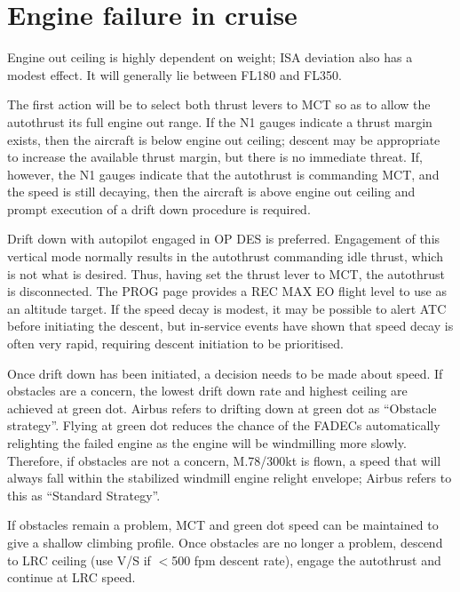 \documentclass[a5paper,11pt,twoside]{book}
\newcommand{\multicite}[1]{
  \nopagebreak
  \noindent{\footnotesize\color{blue}{[ #1 ]}}
}
\begin{document}
\multicite{QRH AER.MISC, FCOM PRO.AER.MISC, FCTM PRO.AER.MISC}

\section{Engine failure in cruise}

Engine out ceiling is highly dependent on weight; ISA deviation also has a
modest effect. It will generally lie between FL180 and FL350.

The first action will be to select both thrust levers to MCT so as to allow the
autothrust its full engine out range. If the N1 gauges indicate a thrust margin
exists, then the aircraft is below engine out ceiling; descent may be
appropriate to increase the available thrust margin, but there is no immediate
threat. If, however, the N1 gauges indicate that the autothrust is commanding
MCT, and the speed is still decaying, then the aircraft is above engine out
ceiling and prompt execution of a drift down procedure is required.

Drift down with autopilot engaged in OP DES is preferred. Engagement of this
vertical mode normally results in the autothrust commanding idle thrust, which
is not what is desired. Thus, having set the thrust lever to MCT, the autothrust
is disconnected. The PROG page provides a REC MAX EO flight level to use as an
altitude target. If the speed decay is modest, it may be possible to alert ATC
before initiating the descent, but in-service events have shown that speed decay
is often very rapid, requiring descent initiation to be prioritised.

Once drift down has been initiated, a decision needs to be made about speed. If
obstacles are a concern, the lowest drift down rate and highest ceiling are
achieved at green dot. Airbus refers to drifting down at green dot as “Obstacle
strategy”. Flying at green dot reduces the chance of the FADECs automatically
relighting the failed engine as the engine will be windmilling more
slowly. Therefore, if obstacles are not a concern, M.78/300kt is flown, a speed
that will always fall within the stabilized windmill engine relight envelope;
Airbus refers to this as “Standard Strategy”.

If obstacles remain a problem, MCT and green dot speed can be maintained to give
a shallow climbing profile. Once obstacles are no longer a problem, descend to
LRC ceiling (use V/S if $<$500 fpm descent rate), engage the autothrust and
continue at LRC speed.
\end{document}
